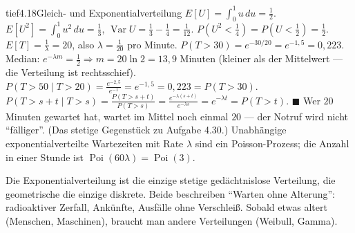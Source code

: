 \begin{loesungkarte}{tief}{4.18}{Gleich- und Exponentialverteilung}
$E[U] = \int_0^1u\,du = \frac12$. $E[U^{2}] = \int_0^1u^{2}\,du = \frac13$, $\operatorname{Var}U = \frac13 - \frac14 = \frac1{12}$. $P(U^{2} < \frac14) = P(U < \frac12) = \frac12$.
$E[T] = \frac1\lambda = 20$, also $\lambda = \frac1{20}$ pro Minute. $P(T > 30) = e^{-30/20} = e^{-1{,}5} = 0{,}223$. Median: $e^{-\lambda m} = \frac12\Rightarrow m = 20\ln2 = 13{,}9$ Minuten (kleiner als der Mittelwert --- die Verteilung ist rechtsschief). $P(T > 50\mid T > 20) = \frac{e^{-2{,}5}}{e^{-1}} = e^{-1{,}5} = 0{,}223 = P(T > 30)$.
$P(T > s + t\mid T > s) = \frac{P(T > s + t)}{P(T > s)} = \frac{e^{-\lambda(s + t)}}{e^{-\lambda s}} = e^{-\lambda t} = P(T > t)$. $\blacksquare$ Wer $20$ Minuten gewartet hat, wartet im Mittel noch einmal $20$ --- der Notruf wird nicht \enquote{fälliger}. (Das stetige Gegenstück zu Aufgabe 4.30.)
Unabhängige exponentialverteilte Wartezeiten mit Rate $\lambda$ sind ein Poisson-Prozess; die Anzahl in einer Stunde ist $\operatorname{Poi}(60\lambda) = \operatorname{Poi}(3)$.
\begin{mitnehmen}\kastentext
Die Exponentialverteilung ist die einzige stetige gedächtnislose Verteilung, die geometrische die einzige diskrete. Beide beschreiben \enquote{Warten ohne Alterung}: radioaktiver Zerfall, Ankünfte, Ausfälle ohne Verschleiß. Sobald etwas altert (Menschen, Maschinen), braucht man andere Verteilungen (Weibull, Gamma).
\end{mitnehmen}
\end{loesungkarte}

